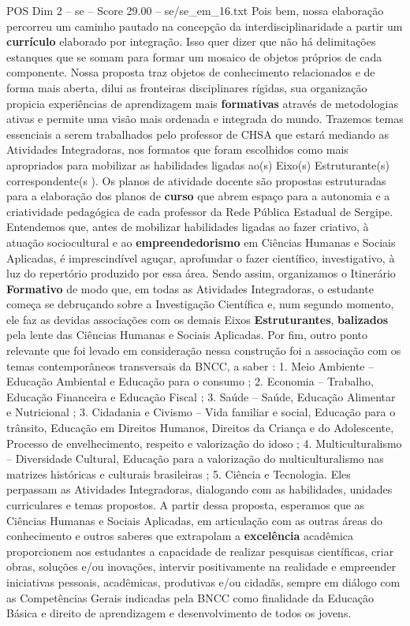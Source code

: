 \begin{textsample}{POS Dim 2 – se – Score 29.00 – se/se\_em\_16.txt}
Pois bem, nossa elaboração percorreu um caminho pautado na concepção da interdisciplinaridade a partir um \textbf{currículo} elaborado por integração.
Isso quer dizer que não há delimitações estanques que se somam para formar um mosaico de objetos próprios de cada componente.
Nossa proposta traz objetos de conhecimento relacionados e de forma mais aberta, dilui as fronteiras disciplinares rígidas, sua organização propicia experiências de aprendizagem mais \textbf{formativas} através de metodologias ativas e permite uma visão mais ordenada e integrada do mundo.
Trazemos temas essenciais a serem trabalhados pelo professor de CHSA que estará mediando as Atividades Integradoras, nos formatos que foram escolhidos como mais apropriados para mobilizar as habilidades ligadas ao(s) Eixo(s) Estruturante(s) correspondente(s ).
Os planos de atividade docente são propostas estruturadas para a elaboração dos planos de \textbf{curso} que abrem espaço para a autonomia e a criatividade pedagógica de cada professor da Rede Pública Estadual de Sergipe.
Entendemos que, antes de mobilizar habilidades ligadas ao fazer criativo, à atuação sociocultural e ao \textbf{empreendedorismo} em Ciências Humanas e Sociais Aplicadas, é imprescindível aguçar, aprofundar o fazer científico, investigativo, à luz do repertório produzido por essa área.
Sendo assim, organizamos o Itinerário \textbf{Formativo} de modo que, em todas as Atividades Integradoras, o estudante começa se debruçando sobre a Investigação Científica e, num segundo momento, ele faz as devidas associações com os demais Eixos \textbf{Estruturantes}, \textbf{balizados} pela lente das Ciências Humanas e Sociais Aplicadas.
Por fim, outro ponto relevante que foi levado em consideração nessa construção foi a associação com os temas contemporâneos transversais da BNCC, a saber : 1.
Meio Ambiente – Educação Ambiental e Educação para o consumo ; 2.
Economia – Trabalho, Educação Financeira e Educação Fiscal ; 3.
Saúde – Saúde, Educação Alimentar e Nutricional ; 3.
Cidadania e Civismo – Vida familiar e social, Educação para o trânsito, Educação em Direitos Humanos, Direitos da Criança e do Adolescente, Processo de envelhecimento, respeito e valorização do idoso ; 4.
Multiculturalismo – Diversidade Cultural, Educação para a valorização do multiculturalismo nas matrizes históricas e culturais brasileiras ; 5.
Ciência e Tecnologia.
Eles perpassam as Atividades Integradoras, dialogando com as habilidades, unidades curriculares e temas propostos.
A partir dessa proposta, esperamos que as Ciências Humanas e Sociais Aplicadas, em articulação com as outras áreas do conhecimento e outros saberes que extrapolam a \textbf{excelência} acadêmica proporcionem aos estudantes a capacidade de realizar pesquisas científicas, criar obras, soluções e/ou inovações, intervir positivamente na realidade e empreender iniciativas pessoais, acadêmicas, produtivas e/ou cidadãs, sempre em diálogo com as Competências Gerais indicadas pela BNCC como finalidade da Educação Básica e direito de aprendizagem e desenvolvimento de todos os jovens.

\end{textsample}
